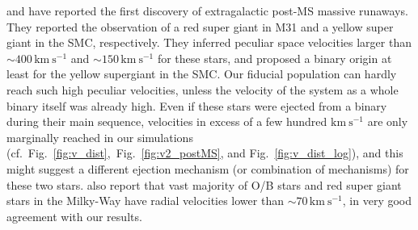 \documentclass{aa}
\DeclareRobustCommand{\Figref}[1]{Fig.~\ref{#1}}
\begin{document}
\cite{evans:15} and \cite{neugent:18} have reported the first
discovery of extragalactic post-MS massive runaways. They reported the
observation of a red super giant in M31 and a yellow super giant in the SMC,
respectively. They inferred peculiar space velocities larger than
$\sim$$400\,\mathrm{km\ s^{-1}}$ and $\sim$$150\,\mathrm{km\ s^{-1}}$ for
these stars, and proposed a binary origin at least for the yellow
supergiant in the SMC. Our fiducial population can hardly reach such
high peculiar velocities, unless the velocity of the system as a whole binary itself was already 
high. Even if these stars were ejected from a binary during their main
sequence, velocities in excess of a few hundred $\mathrm{km\ s^{-1}}$
are only marginally reached in our simulations
(cf.~\Figref{fig:v_dist},~\Figref{fig:v2_postMS}, and
\Figref{fig:v_dist_log}), and this might suggest a different ejection
mechanism (or combination of mechanisms) for these two stars. \cite{evans:15} also report that
vast majority of O/B stars and red super giant stars in the Milky-Way have radial
velocities lower than $\sim70\,\mathrm{km\ s^{-1}}$, in very good
agreement with our results.
\end{document}
